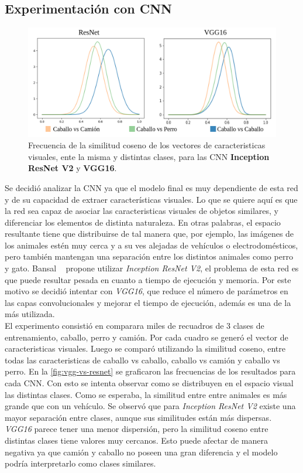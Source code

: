 \subsection{Experimentación con CNN} \label{ssec:experimentacionconcnn}
\begin{figure}
	\centering
	\includegraphics[width=1\linewidth]{img/vgg-vs-resnet}
	\caption{Frecuencia de la similitud coseno de los vectores de caracteristicas visuales, ente la misma y distintas clases, para las CNN  \textbf{Inception ResNet V2} y \textbf{VGG16}.}
	\label{fig:vgg-vs-resnet}
\end{figure}

Se decidió analizar la CNN ya que el modelo final es muy dependiente de esta red y de su capacidad de extraer características visuales. Lo que se quiere aquí es que la red sea capaz de asociar las caracteristicas visuales de objetos similares, y diferenciar los elementos de distinta naturaleza. En otras palabras, el espacio resultante tiene que distribuirse de tal manera que, por ejemplo, las imágenes de los animales estén muy cerca y a su ves alejadas de vehículos o electrodomésticos, pero también mantengan una separación entre los distintos animales como perro y gato. Bansal \etal~\cite{bansal2018zero} propone utilizar \textit{Inception ResNet V2}, el problema de esta red es que puede resultar pesada en cuanto a tiempo de ejecución y memoria. Por este motivo se decidió intentar con \textit{VGG16}, que reduce el número de parámetros en las capas convolucionales y mejorar el tiempo de ejecución, además es una de la más utilizada.\\

El experimento consistió en comparara miles de recuadros de 3 clases de entrenamiento, caballo, perro y camión.  Por cada cuadro se generó el vector de caracteristicas visuales. Luego se comparó utilizando la similitud coseno, entre todas las caracteristicas de caballo vs caballo, caballo vs camión y caballo vs perro. En la \autoref{fig:vgg-vs-resnet} se graficaron las frecuencias de los resultados para cada CNN. Con esto se intenta observar como se distribuyen en el espacio visual las distintas clases. Como se esperaba, la similitud entre entre animales es más grande que con un vehículo. Se observó que para \textit{Inception ResNet V2} existe una mayor separación entre clases, aunque sus similitudes están más dispersas. \textit{VGG16} parece tener una menor dispersión, pero la similitud coseno entre distintas clases tiene valores muy cercanos. Esto puede afectar de manera negativa ya que camión y caballo no poseen una gran diferencia y el modelo podría interpretarlo como clases similares.\\


